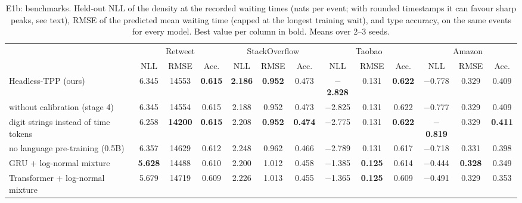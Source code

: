 \begin{table}[t]
\caption{E1b: benchmarks. Held-out NLL of the density at the recorded waiting times (nats per event; with rounded timestamps it can favour sharp peaks, see text), RMSE of the predicted mean waiting time (capped at the longest training wait), and type accuracy, on the same events for every model. Best value per column in bold. Means over 2--3 seeds.}
\label{tab:rq1bench}
\footnotesize\setlength{\tabcolsep}{3pt}
\begin{tabular}{@{}lcccccccccccc@{}}
\toprule
 & \multicolumn{3}{c}{Retweet} & \multicolumn{3}{c}{StackOverflow} & \multicolumn{3}{c}{Taobao} & \multicolumn{3}{c}{Amazon}\\
\cmidrule(lr){2-4} \cmidrule(lr){5-7} \cmidrule(lr){8-10} \cmidrule(lr){11-13}
 & NLL & RMSE & Acc. & NLL & RMSE & Acc. & NLL & RMSE & Acc. & NLL & RMSE & Acc.\\
\midrule
Headless-TPP (ours) & 6.345 & 14553 & \textbf{0.615} & \textbf{2.186} & \textbf{0.952} & 0.473 & \textbf{$-$2.828} & 0.131 & \textbf{0.622} & $-$0.778 & 0.329 & 0.409\\
\quad without calibration (stage 4) & 6.345 & 14554 & 0.615 & 2.188 & 0.952 & 0.473 & $-$2.825 & 0.131 & 0.622 & $-$0.777 & 0.329 & 0.409\\
\quad digit strings instead of time tokens & 6.258 & \textbf{14200} & \textbf{0.615} & 2.208 & \textbf{0.952} & \textbf{0.474} & $-$2.775 & 0.131 & \textbf{0.622} & \textbf{$-$0.819} & 0.329 & \textbf{0.411}\\
\quad no language pre-training (0.5B) & 6.357 & 14629 & 0.612 & 2.248 & 0.962 & 0.466 & $-$2.789 & 0.131 & 0.617 & $-$0.718 & 0.331 & 0.398\\
GRU + log-normal mixture & \textbf{5.628} & 14488 & 0.610 & 2.200 & 1.012 & 0.458 & $-$1.385 & \textbf{0.125} & 0.614 & $-$0.444 & \textbf{0.328} & 0.349\\
Transformer + log-normal mixture & 5.679 & 14719 & 0.609 & 2.226 & 1.013 & 0.455 & $-$1.365 & \textbf{0.125} & 0.609 & $-$0.491 & 0.329 & 0.353\\
\bottomrule
\end{tabular}
\end{table}
